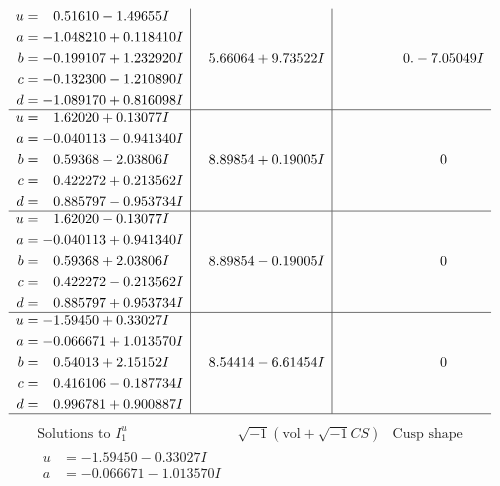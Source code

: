 \documentclass[1p]{elsarticle_modified}
\theoremstyle{definition}
\newcommand{\I}{\sqrt{-1}}
\begin{document}
$$\begin{array}{c|c|c}
\begin{aligned}
u &= \phantom{-}0.51610 - 1.49655 I \\
a &= -1.048210 + 0.118410 I \\
b &= -0.199107 + 1.232920 I \\
c &= -0.132300 - 1.210890 I \\
d &= -1.089170 + 0.816098 I\end{aligned}
 & \phantom{-}5.66064 + 9.73522 I & \phantom{-0.000000 } 0. - 7.05049 I \\ \hline\begin{aligned}
u &= \phantom{-}1.62020 + 0.13077 I \\
a &= -0.040113 - 0.941340 I \\
b &= \phantom{-}0.59368 - 2.03806 I \\
c &= \phantom{-}0.422272 + 0.213562 I \\
d &= \phantom{-}0.885797 - 0.953734 I\end{aligned}
 & \phantom{-}8.89854 + 0.19005 I & \phantom{-0.000000 } 0 \\ \hline\begin{aligned}
u &= \phantom{-}1.62020 - 0.13077 I \\
a &= -0.040113 + 0.941340 I \\
b &= \phantom{-}0.59368 + 2.03806 I \\
c &= \phantom{-}0.422272 - 0.213562 I \\
d &= \phantom{-}0.885797 + 0.953734 I\end{aligned}
 & \phantom{-}8.89854 - 0.19005 I & \phantom{-0.000000 } 0 \\ \hline\begin{aligned}
u &= -1.59450 + 0.33027 I \\
a &= -0.066671 + 1.013570 I \\
b &= \phantom{-}0.54013 + 2.15152 I \\
c &= \phantom{-}0.416106 - 0.187734 I \\
d &= \phantom{-}0.996781 + 0.900887 I\end{aligned}
 & \phantom{-}8.54414 - 6.61454 I & \phantom{-0.000000 } 0\\
 \hline 
 \end{array}$$\newpage$$\begin{array}{c|c|c}  
\text{Solutions to }I^u_{1}& \I (\text{vol} + \sqrt{-1}CS) & \text{Cusp shape}\\
 \hline 
\begin{aligned}
u &= -1.59450 - 0.33027 I \\
a &= -0.066671 - 1.013570 I \\

\end{aligned}
\end{array}$$
\end{document}
